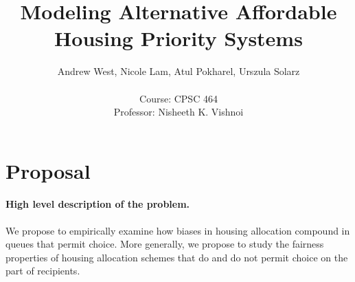 \documentclass[11pt]{article}
\title{\bf Modeling Alternative Affordable Housing Priority Systems }
\author{ Andrew West, Nicole Lam, Atul Pokharel, Urszula Solarz  \\ \\ 
Course: CPSC 464 \\ 
Professor: Nisheeth K. Vishnoi
}
\begin{document}
\maketitle
 
%
%  
%
%
%
%
%
%

\section{Proposal}

\paragraph{High level description of the problem.}

We propose to empirically examine how biases in housing allocation compound in queues that permit choice. More generally, we propose to study the fairness properties of housing allocation schemes that do and do not permit choice on the part of recipients.

 
\end{document}
